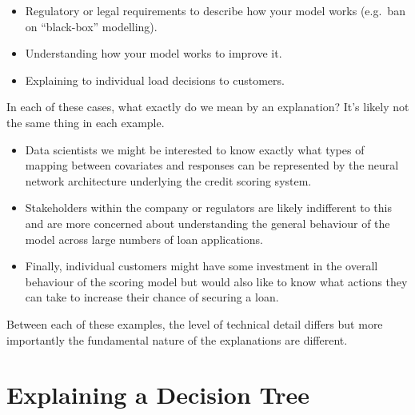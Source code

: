 \documentclass[
  12pt,
]{book}
\providecommand{\tightlist}{%
  \setlength{\itemsep}{0pt}\setlength{\parskip}{0pt}}
\begin{document}
\begin{itemize}
\tightlist
\item
  Regulatory or legal requirements to describe how your model works (e.g.~ban on ``black-box'' modelling).
\item
  Understanding how your model works to improve it.
\item
  Explaining to individual load decisions to customers.
\end{itemize}

In each of these cases, what exactly do we mean by an explanation? It's likely not the same thing in each example.

\begin{itemize}
\item
  Data scientists we might be interested to know exactly what types of mapping between covariates and responses can be represented by the neural network architecture underlying the credit scoring system.
\item
  Stakeholders within the company or regulators are likely indifferent to this and are more concerned about understanding the general behaviour of the model across large numbers of loan applications.
\item
  Finally, individual customers might have some investment in the overall behaviour of the scoring model but would also like to know what actions they can take to increase their chance of securing a loan.
\end{itemize}

Between each of these examples, the level of technical detail differs but more importantly the fundamental nature of the explanations are different.

\hypertarget{explaining-a-decision-tree}{%
\section{Explaining a Decision Tree}\label{explaining-a-decision-tree}}
\end{document}
